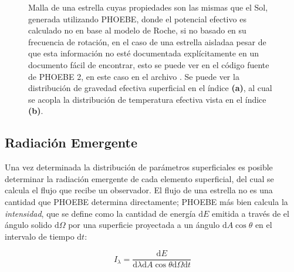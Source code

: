 \begin{figure}[!ht]
	\centering

	\caption[Distribución de gravedad superficial y temperatura efectiva
	local.]{Malla de una estrella cuyas propiedades son las mismas que el Sol,
	generada utilizando PHOEBE, donde el potencial efectivo es calculado no en
	base al modelo de Roche, si no basado en su frecuencia de rotación, en el
	caso de una estrella aislada\textemdash a pesar de que esta información no
	esté documentada explícitamente en un documento fácil de encontrar, esto se
	puede ver en el código fuente de PHOEBE 2, en este caso en el archivo
	\href{https://github.com/phoebe-project/phoebe2/blob/master/phoebe/distortions/rotstar.py}{}.
	Se puede ver la distribución de gravedad efectiva superficial en el índice
	\textbf{(a)}, al cual se acopla la distribución de temperatura efectiva
	vista en el índice \textbf{(b)}.}
	\label{figuraMallaPhoebeTeffLogg}
\end{figure}

\subsection{Radiación Emergente}

Una vez determinada la distribución de parámetros superficiales es posible
determinar la radiación emergente de cada elemento superficial, del cual se
calcula el flujo que recibe un observador. El flujo de una estrella no es una
cantidad que PHOEBE determina directamente; PHOEBE más bien calcula la
\textit{intensidad}, que se define como la cantidad de energía $\mathrm{d}E$
emitida a través de el ángulo solido $\mathrm{d}\Omega$ por una superficie
proyectada a un ángulo $\mathrm{d}A \cos{\theta}$ en el intervalo de tiempo
$\mathrm{d}t$:

\begin{eqfloat}[!ht]
	\centering
	\begin{equation}
		I_{\lambda} = \frac{\textrm{d}E}{\textrm{d}\lambda \textrm{d}A \cos{\theta} \textrm{d}\Omega \textrm{d}t}
	\end{equation}
	\blankcaption
	\label{ecuacionIntensidadMonocromatica}
\end{eqfloat}

